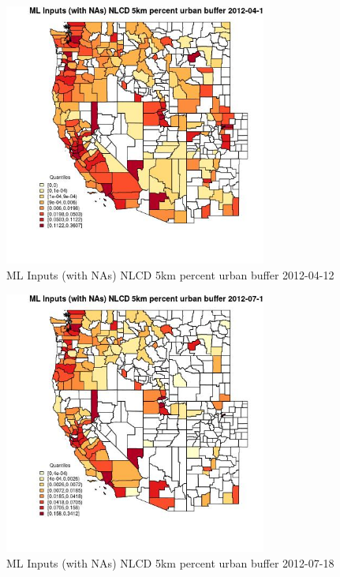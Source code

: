 \begin{figure} 
\centering  
\includegraphics[width=0.77\textwidth]{Code_Outputs/Report_ML_input_PM25_Step4_part_e_de_duplicated_aves_compiled_2019-05-14wNAs_CountyNLCD_5km_percent_urban_bufferMean2012-04-12_2012-04-12.jpg} 
\caption{\label{fig:Report_ML_input_PM25_Step4_part_e_de_duplicated_aves_compiled_2019-05-14wNAsCountyNLCD_5km_percent_urban_bufferMean2012-04-12_2012-04-12}ML Inputs (with NAs) NLCD 5km percent urban buffer 2012-04-12} 
\end{figure} 
 

\begin{figure} 
\centering  
\includegraphics[width=0.77\textwidth]{Code_Outputs/Report_ML_input_PM25_Step4_part_e_de_duplicated_aves_compiled_2019-05-14wNAs_CountyNLCD_5km_percent_urban_bufferMean2012-07-18_2012-07-18.jpg} 
\caption{\label{fig:Report_ML_input_PM25_Step4_part_e_de_duplicated_aves_compiled_2019-05-14wNAsCountyNLCD_5km_percent_urban_bufferMean2012-07-18_2012-07-18}ML Inputs (with NAs) NLCD 5km percent urban buffer 2012-07-18} 
\end{figure} 
 

